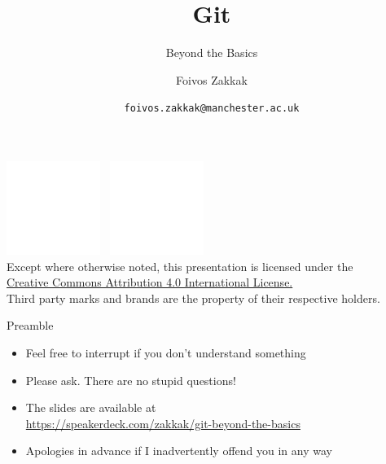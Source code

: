 \documentclass[
14pt,
aspectratio=169,
usenames,
dvipsnames,
x11names]{beamer}
\title[Git: Beyond the Basics]{Git}
\subtitle{Beyond the Basics}
\author[\texttt{foivos.zakkak@manchester.ac.uk}]{Foivos Zakkak}
\date{\texttt{foivos.zakkak@manchester.ac.uk}}
\begin{document}


\begin{frame}[plain]
  \titlepage
  \centering
  \includegraphics[height=.75cm]{../creative-commons/cc}~
  \includegraphics[height=.75cm]{../creative-commons/by}\\[1em]
  \scriptsize{Except where otherwise noted, this presentation is licensed under the\\
    \href{http://creativecommons.org/licenses/by/4.0/}%
    {Creative Commons Attribution 4.0 International License.}\\[1ex]
    Third party marks and brands are the property of their respective
    holders.}
\end{frame}



\begin{frame}{Preamble}
  \begin{itemize} \setlength{\itemsep}{\fill}
  \item Feel free to \alert{interrupt} if you don't understand something
  \item Please ask. \alert{There are no stupid questions}!
  \item The slides are available at\\ {\small\url{https://speakerdeck.com/zakkak/git-beyond-the-basics}}
  \item %
    Apologies in advance if I \alert{inadvertently} offend you in any way
  \end{itemize}
\end{frame}
\end{document}
